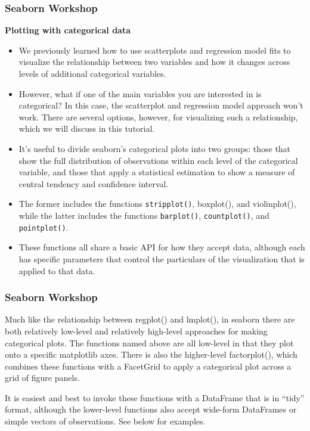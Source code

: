 \documentclass{beamer}
\begin{document}
\begin{frame}[fragile]
\frametitle{Seaborn Workshop}
\large
\noindent \textbf{Plotting with categorical data}
\begin{itemize}
\item We previously learned how to use scatterplots and regression model fits to visualize the relationship between two variables and how it changes across levels of additional categorical variables. 
\item However, what if one of the main variables you are interested in is categorical? In this case, the scatterplot and regression model approach won’t work. There are several options, however, for visualizing such a relationship, which we will discuss in this tutorial.
\end{itemize}

\end{frame}
\begin{frame}[fragile]
\large
\begin{itemize}
\item It’s useful to divide seaborn’s categorical plots into two groups: those that show the full distribution of observations within each level of the categorical variable, and those that apply a statistical estimation to show a measure of central tendency and confidence interval. \item The former includes the functions \texttt{stripplot()}, boxplot(), and violinplot(), while the latter includes the functions \texttt{barplot()}, \texttt{countplot()}, and \texttt{pointplot()}. \item These functions all share a basic API for how they accept data, although each has specific parameters that control the particulars of the visualization that is applied to that data.
\end{itemize}

\end{frame}
\begin{frame}[fragile]
\frametitle{Seaborn Workshop}

Much like the relationship between regplot() and lmplot(), in seaborn there are both relatively low-level and relatively high-level approaches for making categorical plots. The functions named above are all low-level in that they plot onto a specific matplotlib axes. There is also the higher-level factorplot(), which combines these functions with a FacetGrid to apply a categorical plot across a grid of figure panels.

It is easiest and best to invoke these functions with a DataFrame that is in “tidy” format, although the lower-level functions also accept wide-form DataFrames or simple vectors of observations. See below for examples.
\end{frame}
\end{document}
